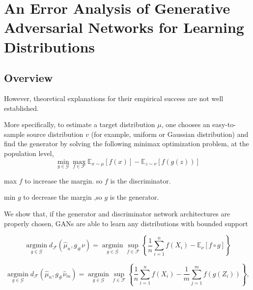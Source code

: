 
\chapter{An Error Analysis of Generative Adversarial Networks for
Learning Distributions}
\section*{Overview}



However, theoretical explanations for
their empirical success are not well established.

More specifically,
to estimate a target distribution $\mu$, one chooses an easy-to-sample source distribution $v$ (for
example, uniform or Gaussian distribution) and find the generator by solving the following
minimax optimization problem, at the population level,
$$
\min _{g \in \mathcal{G}} \max _{f \in \mathcal{F}} \mathbb{E}_{x \sim \mu}[f(x)]-\mathbb{E}_{z \sim \nu}[f(g(z))]$$


max $f$ to increase the margin. so $f$ is the discriminator.

min $g$ to decrease the margin ,so $g$ is the generator.


We show that, if the generator and discriminator network architectures
are properly chosen, GANs are able to learn any distributions with bounded support

$$
\underset{g \in \mathcal{G}}{\operatorname{argmin}} d_{\mathcal{F}}\left(\widehat{\mu}_n, g_{\#} \nu\right)=\underset{g \in \mathcal{G}}{\operatorname{argmin}} \sup _{f \in \mathcal{F}}\left\{\frac{1}{n} \sum_{i=1}^n f\left(X_i\right)-\mathbb{E}_\nu[f \circ g]\right\}
$$

$$
\underset{g \in \mathcal{G}}{\operatorname{argmin}} d_{\mathcal{F}}\left(\widehat{\mu}_n, g_{\#} \widehat{\nu}_m\right)=\underset{g \in \mathcal{G}}{\operatorname{argmin}} \sup _{f \in \mathcal{F}}\left\{\frac{1}{n} \sum_{i=1}^n f\left(X_i\right)-\frac{1}{m} \sum_{j=1}^m f\left(g\left(Z_i\right)\right)\right\},
$$